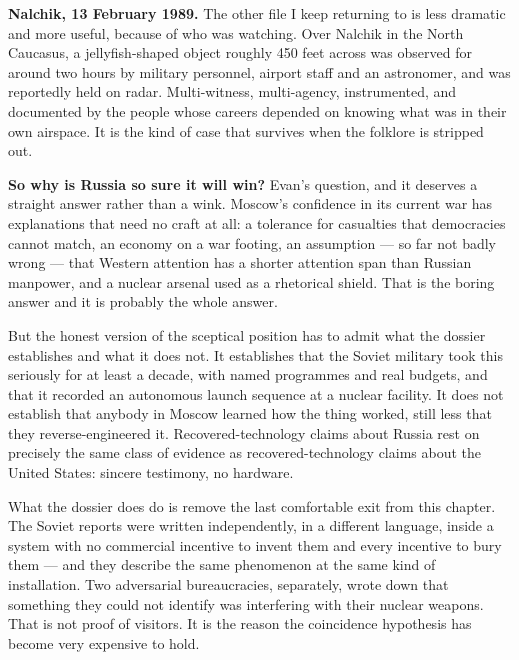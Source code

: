 \textbf{Nalchik, 13 February 1989.} The other file I keep returning to is less dramatic and more
useful, because of who was watching. Over Nalchik in the North Caucasus, a jellyfish-shaped object
roughly 450 feet across was observed for around two hours by military personnel, airport staff and
an astronomer, and was reportedly held on radar. Multi-witness, multi-agency, instrumented, and
documented by the people whose careers depended on knowing what was in their own airspace. It is
the kind of case that survives when the folklore is stripped out.

\textbf{So why is Russia so sure it will win?} Evan's question, and it deserves a straight answer
rather than a wink. Moscow's confidence in its current war has explanations that need no craft at
all: a tolerance for casualties that democracies cannot match, an economy on a war footing, an
assumption --- so far not badly wrong --- that Western attention has a shorter attention span than
Russian manpower, and a nuclear arsenal used as a rhetorical shield. That is the boring answer and
it is probably the whole answer.

But the honest version of the sceptical position has to admit what the dossier establishes and what
it does not. It establishes that the Soviet military took this seriously for at least a decade,
with named programmes and real budgets, and that it recorded an autonomous launch sequence at a
nuclear facility. It does not establish that anybody in Moscow learned how the thing worked, still
less that they reverse-engineered it. Recovered-technology claims about Russia rest on precisely
the same class of evidence as recovered-technology claims about the United States: sincere
testimony, no hardware. 

What the dossier does do is remove the last comfortable exit from this chapter. The Soviet reports
were written independently, in a different language, inside a system with no commercial incentive
to invent them and every incentive to bury them --- and they describe the same phenomenon at the
same kind of installation. Two adversarial bureaucracies, separately, wrote down that something
they could not identify was interfering with their nuclear weapons. That is not proof of visitors.
It is the reason the coincidence hypothesis has become very expensive to hold.

